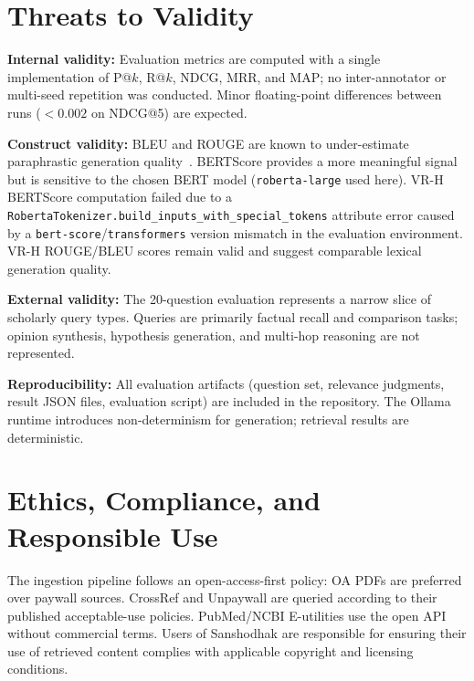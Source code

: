 \documentclass[journal]{IEEEtran}
\begin{document}
\section{Threats to Validity}
\label{sec:threats}

\textbf{Internal validity:}
Evaluation metrics are computed with a single implementation of
P@$k$, R@$k$, NDCG, MRR, and MAP; no inter-annotator or
multi-seed repetition was conducted. Minor floating-point
differences between runs ($<0.002$ on NDCG@5) are expected.

\textbf{Construct validity:}
BLEU and ROUGE are known to under-estimate paraphrastic generation
quality~\cite{zhang2019bertscore}. BERTScore provides a more
meaningful signal but is sensitive to the chosen BERT model
(\texttt{roberta-large} used here). VR-H BERTScore computation
failed due to a \texttt{RobertaTokenizer.build\_inputs\_with\_special\_tokens}
attribute error caused by a \texttt{bert-score}/\texttt{transformers}
version mismatch in the evaluation environment. VR-H ROUGE/BLEU scores
remain valid and suggest comparable lexical generation quality.

\textbf{External validity:}
The 20-question evaluation represents a narrow slice of scholarly
query types. Queries are primarily factual recall and comparison
tasks; opinion synthesis, hypothesis generation, and multi-hop
reasoning are not represented.

\textbf{Reproducibility:}
All evaluation artifacts (question set, relevance judgments, result
JSON files, evaluation script) are included in the repository.
The Ollama runtime introduces non-determinism for generation;
retrieval results are deterministic.

\section{Ethics, Compliance, and Responsible Use}
\label{sec:ethics}

The ingestion pipeline follows an open-access-first policy: OA PDFs
are preferred over paywall sources. CrossRef and Unpaywall are
queried according to their published acceptable-use policies.
PubMed/NCBI E-utilities use the open API without commercial terms.
Users of Sanshodhak are responsible for ensuring their use of
retrieved content complies with applicable copyright and licensing
conditions.
\end{document}
